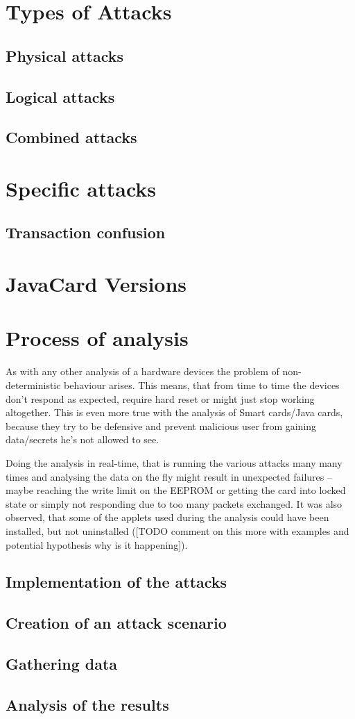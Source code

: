 \documentclass[a4paper]{scrartcl}
\subtitle{}
\begin{document}
\section{Types of Attacks}

\subsection{Physical attacks}
\subsection{Logical attacks}
\subsection{Combined attacks}

\section{Specific attacks}

\subsection{Transaction confusion}


\section{JavaCard Versions}

\section{Process of analysis}

As with any other analysis of a hardware devices the problem of non-deterministic behaviour arises. This means, that from time to time the devices don't respond as expected, require hard reset or might just stop working altogether. This is even more true with the analysis of Smart cards/Java cards, because they try to be defensive and prevent malicious user from gaining data/secrets he's not allowed to see.

Doing the analysis in real-time, that is running the various attacks many many times and analysing the data on the fly might result in unexpected failures -- maybe reaching the write limit on the EEPROM or getting the card into locked state or simply not responding due to too many packets exchanged. It was also observed, that some of the applets used during the analysis could have been installed, but not uninstalled ([TODO comment on this more with examples and potential hypothesis why is it happening]).
\subsection{Implementation of the attacks}
\subsection{Creation of an attack scenario}
\subsection{Gathering data}
\subsection{Analysis of the results}
\end{document}
